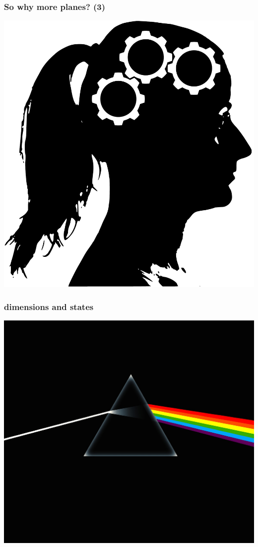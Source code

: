 \documentclass[20pt]{beamer}
\begin{document}
\begin{frame}
\frametitle{So why more planes? (3)}
\begin{center}
\includegraphics[scale=.9]{Figures/gearhead.pdf}
\end{center}
\end{frame}

\begin{frame}
\frametitle{dimensions and states}
\vspace{-10em}
\begin{center}
\hspace*{-6cm}\includegraphics[scale=.7]{Figures/prism.jpg}
\end{center}
\end{frame}
\end{document}
